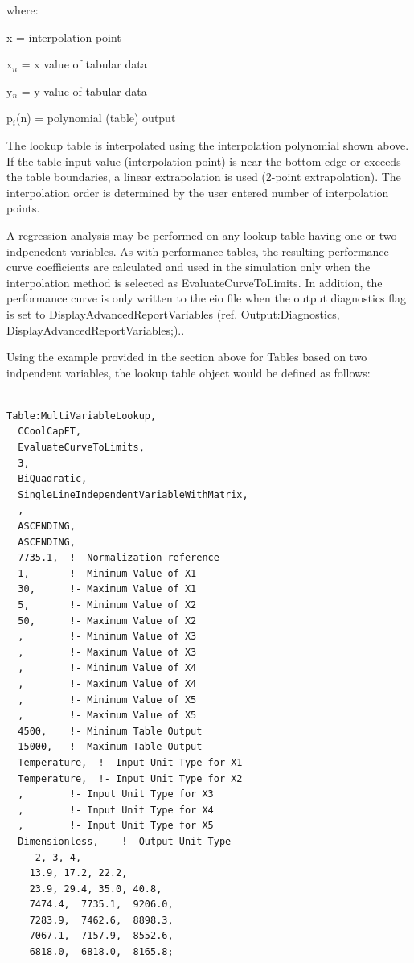 where:

x = interpolation point

x\(_{n}\) = x value of tabular data

y\(_{n}\) = y value of tabular data

p\(_{i}\)(n) = polynomial (table) output

The lookup table is interpolated using the interpolation polynomial shown above. If the table input value (interpolation point) is near the bottom edge or exceeds the table boundaries, a linear extrapolation is used (2-point extrapolation). The interpolation order is determined by the user entered number of interpolation points.

A regression analysis may be performed on any lookup table having one or two indpenedent variables. As with performance tables, the resulting performance curve coefficients are calculated and used in the simulation only when the interpolation method is selected as EvaluateCurveToLimits. In addition, the performance curve is only written to the eio file when the output diagnostics flag is set to DisplayAdvancedReportVariables (ref. Output:Diagnostics, DisplayAdvancedReportVariables;)..

Using the example provided in the section above for Tables based on two indpendent variables, the lookup table object would be defined as follows:

\begin{lstlisting}

Table:MultiVariableLookup,
  CCoolCapFT,
  EvaluateCurveToLimits,
  3,
  BiQuadratic,
  SingleLineIndependentVariableWithMatrix,
  ,
  ASCENDING,
  ASCENDING,
  7735.1,  !- Normalization reference
  1,       !- Minimum Value of X1
  30,      !- Maximum Value of X1
  5,       !- Minimum Value of X2
  50,      !- Maximum Value of X2
  ,        !- Minimum Value of X3
  ,        !- Maximum Value of X3
  ,        !- Minimum Value of X4
  ,        !- Maximum Value of X4
  ,        !- Minimum Value of X5
  ,        !- Maximum Value of X5
  4500,    !- Minimum Table Output
  15000,   !- Maximum Table Output
  Temperature,  !- Input Unit Type for X1
  Temperature,  !- Input Unit Type for X2
  ,        !- Input Unit Type for X3
  ,        !- Input Unit Type for X4
  ,        !- Input Unit Type for X5
  Dimensionless,    !- Output Unit Type
     2, 3, 4,
    13.9, 17.2, 22.2,
    23.9, 29.4, 35.0, 40.8,
    7474.4,  7735.1,  9206.0,
    7283.9,  7462.6,  8898.3,
    7067.1,  7157.9,  8552.6,
    6818.0,  6818.0,  8165.8;
\end{lstlisting}

